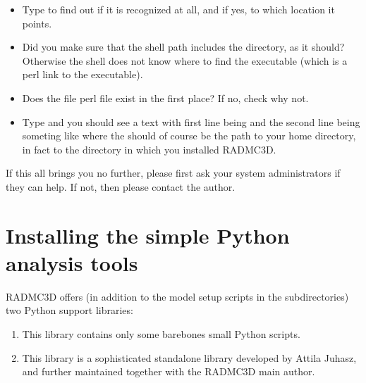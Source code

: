 \documentclass[letterpaper,10pt,english]{sphinxmanual}
\begin{document}
\begin{enumerate}
\begin{itemize}
\item {} 
Type  to find out if it is recognized at all,
and if yes, to which location it points.

\item {} 
Did you make sure that the shell path includes the 
directory, as it should? Otherwise the shell does not know
where to find the  executable (which is
a perl link to the  executable).

\item {} 
Does the file  perl file exist in the
first place? If no, check why not.

\item {} 
Type  and you should
see a text with first line being  and the
second line being someting like
where the  should of course be the path to
your home directory, in fact to the directory in which you installed
RADMC\sphinxhyphen{}3D.

\end{itemize}

\end{enumerate}

If this all brings you no further, please first ask your system administrators
if they can help. If not, then please contact the author.


\section{Installing the simple Python analysis tools}
\label{\detokenize{installation:installing-the-simple-python-analysis-tools}}\label{\detokenize{installation:sec-install-pythonscripts}}
RADMC\sphinxhyphen{}3D offers (in addition to the model setup scripts in the 
subdirectories) two Python support libraries:
\begin{enumerate}
%
\item {} 

This library contains only some bare\sphinxhyphen{}bones small Python scripts.

\item {} 

This library is a sophisticated stand\sphinxhyphen{}alone library developed by
Attila Juhasz, and further maintained together with the RADMC\sphinxhyphen{}3D
main author.

\end{enumerate}
\end{document}
